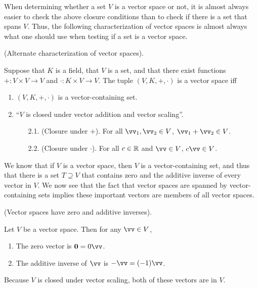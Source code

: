 When determining whether a set $V$ is a vector space or not, it is almost always easier to check the above closure conditions than to check if there is a set that spans $V$. Thus, the following characterization of vector spaces is almost always what one should use when testing if a set is a vector space.

\begin{theorem}
    (Alternate characterization of vector spaces).
    
    Suppose that $K$ is a field, that $V$ is a set, and that there exist functions $+:V \times V \rightarrow V$ and $\cdot:K \times V \rightarrow V$. The tuple $(V, K, +, \cdot)$ is a vector space iff
    
    \begin{enumerate}
        \item $(V, K, +, \cdot)$ is a vector-containing set.
        \item ``$V$ is closed under vector addition and vector scaling''.
        \begin{enumerate}
            \item[2.1.] (Closure under $+$). For all $\vv_1, \vv_2 \in V$, $\vv_1 + \vv_2 \in V$.
            \item[2.2.] (Closure under $\cdot$). For all $c \in \mathbb{R}$ and $\vv \in V$, $c \vv \in V$.
        \end{enumerate}
    \end{enumerate}
\end{theorem}

We know that if $V$ is a vector space, then $V$ is a vector-containing set, and thus that there is a set $T \supseteq V$ that contains zero and the additive inverse of every vector in $V$. We now see that the fact that vector spaces are spanned by vector-containing sets implies these important vectors are members of all vector spaces.

\begin{deriv}
    (Vector spaces have zero and additive inverses).

    Let $V$ be a vector space. Then for any $\vv \in V$,
    
    \begin{enumerate}
        \item The zero vector is $\mathbf{0} = 0\vv$.
        \item The additive inverse of $\vv$ is $-\vv = (-1)\vv$.
    \end{enumerate}

    Because $V$ is closed under vector scaling, both of these vectors are in $V$.
\end{deriv}


